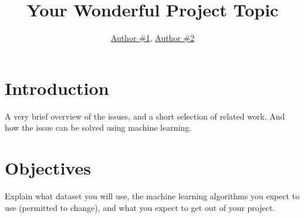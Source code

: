 \documentclass{article}
\title{Your Wonderful Project Topic}
\author{\href{mailto:author1@nyu.edu}{Author \#1}, \href{mailto:author2@nyu.edu}{Author \#2}}
\date{\vspace{-5ex}} %
\begin{document}
\maketitle
\thispagestyle{firstpage}

\section*{Introduction}

A very brief overview of the issues, and a short selection of related work.  And how the issue can be solved using machine learning. 


\section*{Objectives}

Explain what dataset you will use,  the machine learning algorithms you expect to
use (permitted to change), and what you expect to get out of your project.




\end{document}
